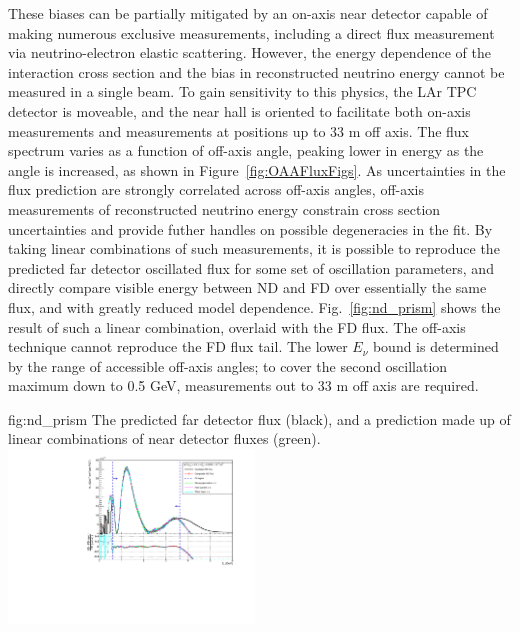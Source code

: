 These biases can be partially mitigated by an on-axis near detector capable of making numerous exclusive measurements, including a direct flux measurement via neutrino-electron elastic scattering. However, the energy dependence of the interaction cross section and the bias in reconstructed neutrino energy cannot be measured in a single beam. To gain sensitivity to this physics, the LAr TPC detector is moveable, and the near hall is oriented to facilitate both on-axis measurements and measurements at positions up to 33 m off axis. The flux spectrum varies as a function of off-axis angle, peaking lower in energy as the angle is increased, as shown in Figure~\ref{fig:OAAFluxFigs}. As uncertainties in the flux prediction are strongly correlated across off-axis angles, off-axis measurements of reconstructed neutrino energy constrain cross section uncertainties and provide futher handles on possible degeneracies in the fit. By taking linear combinations of such measurements, it is possible to reproduce the predicted far detector oscillated flux for some set of oscillation parameters, and directly compare visible energy between ND and FD over essentially the same flux, and with greatly reduced model dependence. Fig.~\ref{fig:nd_prism} shows the result of such a linear combination, overlaid with the FD flux. The off-axis technique cannot reproduce the FD flux tail. The lower $E_{\nu}$ bound is determined by the range of accessible off-axis angles; to cover the second oscillation maximum down to 0.5 GeV, measurements out to 33 m off axis are required.

\begin{dunefigure}{fig:nd_prism}
{The predicted far detector flux (black), and a prediction made up of linear combinations of near detector fluxes (green).}
 \includegraphics[width=0.49\textwidth]{graphics/nuprism_coef_oscSpectrum_0_0022_0_5.pdf}
\end{dunefigure}

